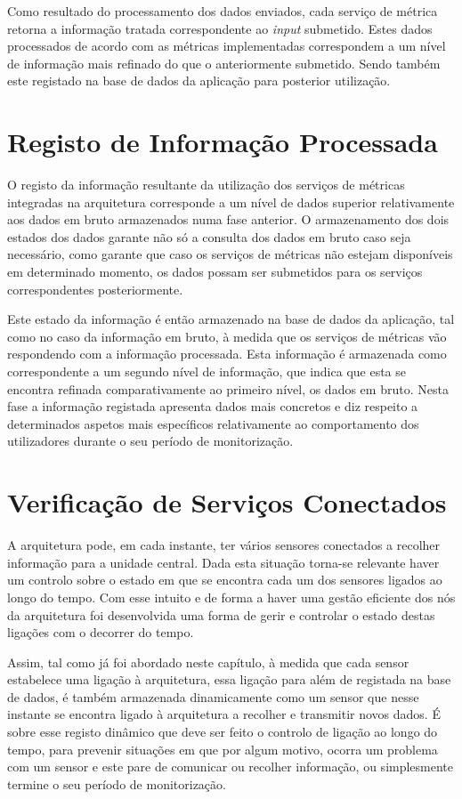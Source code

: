 Como resultado do processamento dos dados enviados, cada serviço de métrica retorna a informação tratada correspondente ao \textit{input} submetido. Estes dados processados de acordo com as métricas implementadas correspondem a um nível de informação mais refinado do que o anteriormente submetido. Sendo também este registado na base de dados da aplicação para posterior utilização.

\section{Registo de Informação Processada}

O registo da informação resultante da utilização dos serviços de métricas integradas na arquitetura corresponde a um nível de dados superior relativamente aos dados em bruto armazenados numa fase anterior. O armazenamento dos dois estados dos dados garante não só a consulta dos dados em bruto caso seja necessário, como garante que caso os serviços de métricas não estejam disponíveis em determinado momento, os dados possam ser submetidos para os serviços correspondentes posteriormente.

Este estado da informação é então armazenado na base de dados da aplicação, tal como no caso da informação em bruto, à medida que os serviços de métricas vão respondendo com a informação processada. Esta informação é armazenada como correspondente a um segundo nível de informação, que indica que esta se encontra refinada comparativamente ao primeiro nível, os dados em bruto. Nesta fase a informação registada apresenta dados mais concretos e diz respeito a determinados aspetos mais específicos relativamente ao comportamento dos utilizadores durante o seu período de monitorização.

\section{Verificação de Serviços Conectados}

A arquitetura pode, em cada instante, ter vários sensores conectados a recolher informação para a unidade central. Dada esta situação torna-se relevante haver um controlo sobre o estado em que se encontra cada um dos sensores ligados ao longo do tempo. Com esse intuito e de forma a haver uma gestão eficiente dos nós da arquitetura foi desenvolvida uma forma de gerir e controlar o estado destas ligações com o decorrer do tempo.

Assim, tal como já foi abordado neste capítulo, à medida que cada sensor estabelece uma ligação à arquitetura, essa ligação para além de registada na base de dados, é também armazenada dinamicamente como um sensor que nesse instante se encontra ligado à arquitetura a recolher e transmitir novos dados. É sobre esse registo dinâmico que deve ser feito o controlo de ligação ao longo do tempo, para prevenir situações em que por algum motivo, ocorra um problema com um sensor e este pare de comunicar ou recolher informação, ou simplesmente termine o seu período de monitorização.

